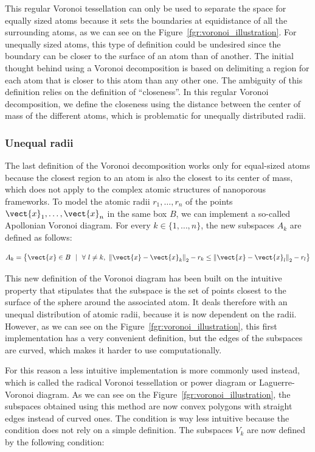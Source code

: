 \documentclass[main]{subfiles}
\begin{document}
This regular Voronoi tessellation can only be used to separate the space for equally sized atoms because it sets the boundaries at equidistance of all the surrounding atoms, as we can see on the Figure~\ref{fgr:voronoi_illustration}. For unequally sized atoms, this type of definition could be undesired since the boundary can be closer to the surface of an atom than of another. The initial thought behind using a Voronoi decomposition is based on delimiting a region for each atom that is closer to this atom than any other one. The ambiguity of this definition relies on the definition of ``closeness''. In this regular Voronoi decomposition, we define the closeness using the distance between the center of mass of the different atoms, which is problematic for unequally distributed radii.

\subsubsection{Unequal radii}

The last definition of the Voronoi decomposition works only for equal-sized atoms because the closest region to an atom is also the closest to its center of mass, which does not apply to the complex atomic structures of nanoporous frameworks. To model the atomic radii $r_1,\ldots,r_n$ of the points $\vect{x}_1,\ldots,\vect{x}_n$ in the same box $B$, we can implement a so-called Apollonian Voronoi diagram.\autocite{voronoi_apollonian} For every $k\in\{1,\ldots,n\}$, the new subspaces $A_{k}$ are defined as follows:

\begin{equation}\label{eq:r_voronoi_apollonian}
  A_{k} = \left\{\vect{x} \in B\ \ |\ \ \forall\ l\neq k,\ {\lVert \vect{x}-\vect{x}_k \rVert}_2 - r_k \leq {\lVert \vect{x}-\vect{x}_l \rVert}_2 - r_l \right\}
\end{equation}

This new definition of the Voronoi diagram has been built on the intuitive property that stipulates that the subspace is the set of points closest to the surface of the sphere around the associated atom. It deals therefore with an unequal distribution of atomic radii, because it is now dependent on the radii. However, as we can see on the Figure~\ref{fgr:voronoi_illustration}, this first implementation has a very convenient definition, but the edges of the subspaces are curved, which makes it harder to use computationally. 

For this reason a less intuitive implementation is more commonly used instead, which is called the radical Voronoi tessellation or power diagram or Laguerre-Voronoi diagram.\autocite{aurenhammer_1987} As we can see on the Figure~\ref{fgr:voronoi_illustration}, the subspaces obtained using this method are now convex polygons with straight edges instead of curved ones. The condition is way less intuitive because the condition does not rely on a simple definition. The subspaces $V_k$ are now defined by the following condition:
\end{document}
